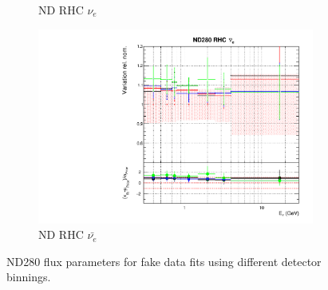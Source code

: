 \begin{figure}[t]
\begin{subfigure}{0.45\textwidth}
  \caption{ND RHC $\nu_e$}
\end{subfigure}
\begin{subfigure}{0.45\textwidth}
  \centering
  \includegraphics[width=0.75\linewidth]{figs/detcovbinflux_7}
  \caption{ND RHC $\bar{\nu_e}$}
\end{subfigure}
\caption{ND280 flux parameters for fake data fits using different detector binnings.}
\label{fig:detcovbinfluxND}
\end{figure}

